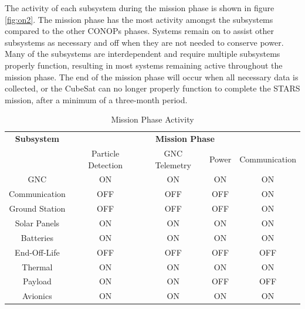 The activity of each subsystem during the mission phase is shown in figure \ref{fig:on2}. The mission phase has the most activity amongst the subsystems compared to the other CONOPs phases.  Systems remain on to assist other subsystems as necessary and off when they are not needed to conserve power.  Many of the subsystems are interdependent and require multiple subsystems properly function, resulting in most systems remaining active throughout the mission phase.  The end of the mission phase will occur when all necessary data is collected, or the CubeSat can no longer properly function to complete the STARS mission, after a minimum of a three-month period.  

\begin{table}[htbp]
  \centering
  \caption{Mission Phase Activity}
    \begin{tabular}{|c|c|c|c|c|}
    \hline 
    \textbf{Subsystem} & \multicolumn{4}{c|}{\textbf{Mission Phase }} \\
          & \multicolumn{1}{c}{Particle Detection } & \multicolumn{1}{c}{GNC Telemetry} & \multicolumn{1}{c}{Power} & Communication \\
    GNC   & \cellcolor[rgb]{ .573,  .816,  .314}ON & \cellcolor[rgb]{ .573,  .816,  .314}ON & \cellcolor[rgb]{ .573,  .816,  .314}ON & \cellcolor[rgb]{ .573,  .816,  .314}ON \\
 Communication & \cellcolor[rgb]{ .753,  0,  0}OFF & \cellcolor[rgb]{ .753,  0,  0}OFF & \cellcolor[rgb]{ .753,  0,  0}OFF & \cellcolor[rgb]{ .573,  .816,  .314}ON \\
   Ground Station & \cellcolor[rgb]{ .753,  0,  0}OFF & \cellcolor[rgb]{ .753,  0,  0}OFF & \cellcolor[rgb]{ .753,  0,  0}OFF & \cellcolor[rgb]{ .573,  .816,  .314}ON \\
   Solar Panels  & \cellcolor[rgb]{ .573,  .816,  .314}ON & \cellcolor[rgb]{ .573,  .816,  .314}ON & \cellcolor[rgb]{ .573,  .816,  .314}ON & \cellcolor[rgb]{ .573,  .816,  .314}ON \\
   Batteries  & \cellcolor[rgb]{ .573,  .816,  .314}ON & \cellcolor[rgb]{ .573,  .816,  .314}ON & \cellcolor[rgb]{ .573,  .816,  .314}ON & \cellcolor[rgb]{ .573,  .816,  .314}ON \\
   End-Off-Life & \cellcolor[rgb]{ .753,  0,  0}OFF & \cellcolor[rgb]{ .753,  0,  0}OFF & \cellcolor[rgb]{ .753,  0,  0}OFF & \cellcolor[rgb]{ .753,  0,  0}OFF \\
    Thermal  & \cellcolor[rgb]{ .573,  .816,  .314}ON & \cellcolor[rgb]{ .573,  .816,  .314}ON & \cellcolor[rgb]{ .573,  .816,  .314}ON & \cellcolor[rgb]{ .573,  .816,  .314}ON \\
   Payload & \cellcolor[rgb]{ .573,  .816,  .314}ON & \cellcolor[rgb]{ .573,  .816,  .314}ON & \cellcolor[rgb]{ .753,  0,  0}OFF & \cellcolor[rgb]{ .753,  0,  0}OFF \\
   Avionics & \cellcolor[rgb]{ .573,  .816,  .314}ON & \cellcolor[rgb]{ .573,  .816,  .314}ON & \cellcolor[rgb]{ .573,  .816,  .314}ON & \cellcolor[rgb]{ .573,  .816,  .314}ON \\
    \hline 
    \end{tabular}
  \label{tab:on2}
\end{table}

